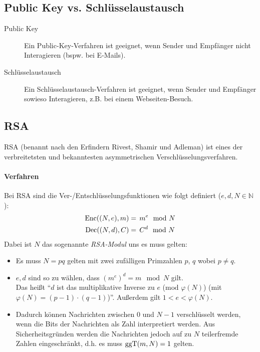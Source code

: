         \subsection{Public Key vs. Schlüsselaustausch}
            \begin{description}
            	\item[Public Key] Ein Public-Key-Verfahren ist geeignet, wenn Sender und Empfänger nicht Interagieren (bspw. bei E-Mails).
            	\item[Schlüsselaustausch] Ein Schlüsselaustausch-Verfahren ist geeignet, wenn Sender und Empfänger sowieso Interagieren, z.B. bei einem Webseiten-Besuch.
            \end{description}

        \subsection{RSA}
            RSA (benannt nach den Erfindern Rivest, Shamir und Adleman) ist eines der verbreitetsten und bekanntesten asymmetrischen Verschlüsselungsverfahren.

			\paragraph{Verfahren}
				Bei RSA sind die Ver-/Entschlüsselungsfunktionen wie folgt definiert (\( e, d, N \in \mathbb{N} \)):
				\begin{align*}
					\textrm{Enc}((N, e), m) &=\, m ^ e \mod N \\
					\textrm{Dec}((N, d), C) &=\, C ^ d \mod N
				\end{align*}
				Dabei ist \(N\) das sogenannte \textit{RSA-Modul} uns es muss gelten:
				\begin{itemize}
					\item Es muss \( N = pq \) gelten mit zwei zufälligen Primzahlen \( p \), \( q \) wobei \( p \neq q \).
					\item \( e, d \) sind so zu wählen, dass \( (m ^ e) ^ d = m \mod N \) gilt. \\ Das heißt \enquote{\(d\) ist das multiplikative Inverse zu \( e \) (\( \textrm{mod } \varphi(N) \)) (mit \( \varphi(N) = (p - 1) \cdot (q - 1) \))}. Außerdem gilt \( 1 < e < \varphi(N) \).
					\item Dadurch können Nachrichten zwischen \( 0 \) und \( N - 1 \) verschlüsselt werden, wenn die Bits der Nachrichten als Zahl interpretiert werden. Aus Sicherheitsgründen werden die Nachrichten jedoch auf zu \(N\) teilerfremde Zahlen eingeschränkt, d.h. es muss \( \textrm{ggT}(m, N) = 1 \) gelten.
				\end{itemize}
			
